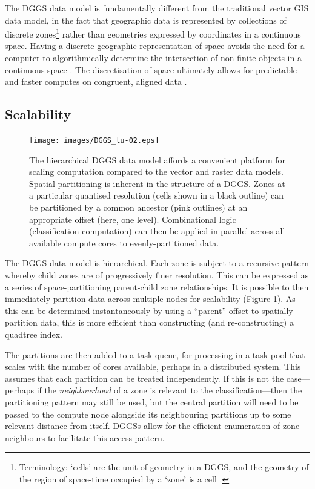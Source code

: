 \documentclass[]{interact}
\theoremstyle{plain}%
\theoremstyle{definition}
\theoremstyle{remark}
\begin{document}
The \ac{DGGS} data model is fundamentally different from the traditional vector \ac{GIS} data model, in the fact that geographic data is represented by collections of discrete zones\footnote{Terminology: `cells' are the unit of geometry in a \ac{DGGS}, and the geometry of the region of space-time occupied by a `zone' is a cell \citep{topic21}.} rather than geometries expressed by coordinates in a continuous space. Having a discrete geographic representation of space avoids the need for a computer to algorithmically determine the intersection of non-finite objects in a continuous space \citep{bentley1979algorithms,robertson2020integrated}. The discretisation of space ultimately allows for predictable and faster computes on congruent, aligned data \citep{dutton1989modelling}.

\subsection{Scalability}

\begin{figure}[t]
    \centering
    \texttt{[image: images/DGGS\_lu-02.eps]}
    \caption{The hierarchical \ac{DGGS} data model affords a convenient platform for scaling computation compared to the vector and raster data models. Spatial partitioning is inherent in the structure of a \ac{DGGS}. Zones at a particular quantised resolution (cells shown in a black outline) can be partitioned by a common ancestor (pink outlines) at an appropriate offset (here, one level). Combinational logic (classification computation) can then be applied in parallel across all available compute cores to evenly-partitioned data.}
    \label{fig:Scalable}
\end{figure}

The \ac{DGGS} data model is hierarchical. Each zone is subject to a recursive pattern whereby child zones are of progressively finer resolution. This can be expressed as a series of space-partitioning parent-child zone relationships. It is possible to then immediately partition data across multiple nodes for scalability (Figure \ref{fig:Scalable}). As this can be determined instantaneously by using a ``parent'' offset to spatially partition data, this is more efficient than constructing (and re-constructing) a quadtree index.

The partitions are then added to a task queue, for processing in a task pool that scales with the number of cores available, perhaps in a distributed system. This assumes that each partition can be treated independently. If this is not the case---perhaps if the \textit{neighbourhood} of a zone is relevant to the classification---then the partitioning pattern may still be used, but the central partition will need to be passed to the compute node alongside its neighbouring partitions up to some relevant distance from itself. \acp{DGGS} allow for the efficient enumeration of zone neighbours to facilitate this access pattern.
\end{document}
